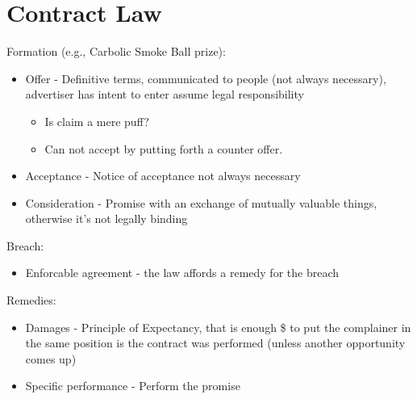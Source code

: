 \documentclass[
  letterpaper,
  landscape,
  columns=3,
  draft,
]{cheatsheet}
\begin{document}
  \section{Contract Law}
  Formation (e.g., Carbolic Smoke Ball prize):
  \begin{itemize}
    \item Offer - Definitive terms, communicated to people (not always necessary), advertiser has intent to enter assume legal responsibility
          \begin{itemize}
            \item Is claim a mere puff?
            \item Can not accept by putting forth a counter offer.
          \end{itemize}
    \item Acceptance - Notice of acceptance not always necessary
    \item Consideration - Promise with an exchange of mutually valuable things, otherwise it's not legally binding
  \end{itemize}
  Breach:
  \begin{itemize}
    \item Enforcable agreement - the law affords a remedy for the breach
  \end{itemize}
  Remedies:
  \begin{itemize}
    \item Damages - Principle of Expectancy, that is enough \$ to put the complainer in the same position is the contract was performed (unless another opportunity comes up)
    \item Specific performance - Perform the promise
  \end{itemize}
\end{document}
